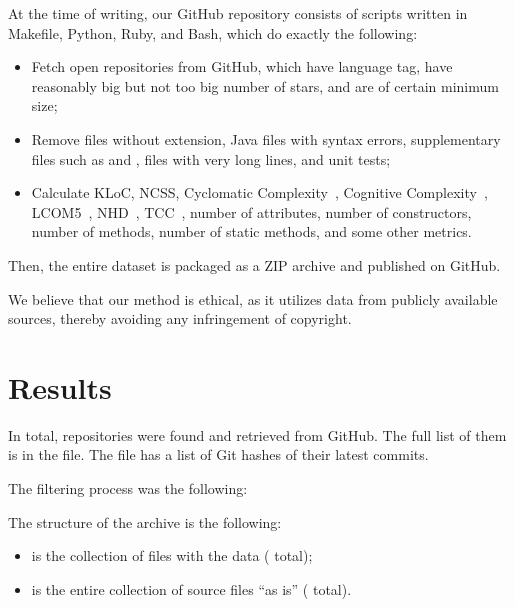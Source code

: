 \documentclass[sigplan,nonacm,review,anonymous]{acmart}
\begin{document}
At the time of writing, our GitHub repository consists of scripts written in Makefile,
Python, Ruby, and Bash, which do exactly the following:
\begin{itemize}
    \item Fetch open repositories from GitHub, which have  language
    tag, have reasonably big but not too big number of stars, and are
    of certain minimum size;
    \item Remove files without  extension, Java files with syntax errors,
    supplementary files such as  and ,
    files with very long lines, and unit tests;
    \item Calculate KLoC, NCSS, Cyclomatic Complexity~\citep{mccabe1976complexity},
    Cognitive Complexity~\citep{campbell2018cognitive}, LCOM5~\citep{henderson1996coupling},
    NHD~\citep{counsell2006interpretation}, TCC~\citep{bieman1995cohesion},
    number of attributes, number of constructors, number of methods, number of static methods,
    and some other metrics.
\end{itemize}

Then, the entire dataset is packaged as a ZIP archive and published
on GitHub.

We believe that our method is ethical, as it utilizes data from publicly
available sources, thereby avoiding any infringement of copyright.

\section{Results}\label{sec:results}

In total, \unskip{} repositories
were found and retrieved from GitHub.
The full list of them is in the  file.
The  file has a list of Git hashes of their latest commits.

The filtering process was the following:

\begin{enumerate}
\unskip{}
\end{enumerate}

The structure of the archive is the following:

\begin{itemize}

  \item {} is the collection of  files with the data
  (\unskip{} total);

  \item {} is the entire collection of
  \unskip{}
  source files ``as is''
  (\unskip{} total).

\end{itemize}
\end{document}
